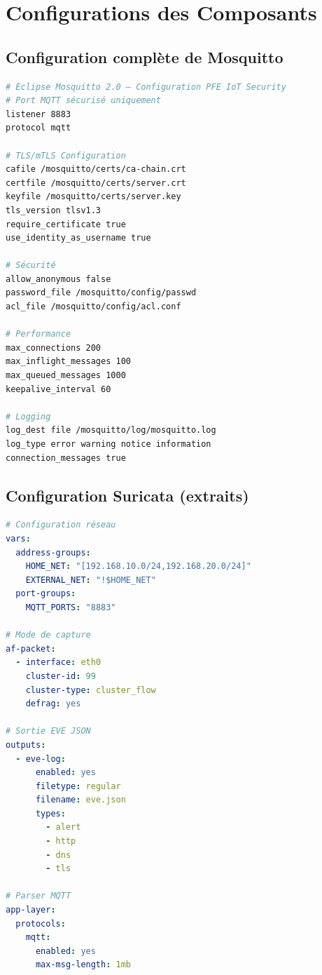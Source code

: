 \chapter{Configurations des Composants}
\label{annex:configs}

\section{Configuration complète de Mosquitto}

\begin{lstlisting}[language=bash, caption=mosquitto.conf — Configuration TLS/mTLS complète]
# Eclipse Mosquitto 2.0 — Configuration PFE IoT Security
# Port MQTT sécurisé uniquement
listener 8883
protocol mqtt

# TLS/mTLS Configuration
cafile /mosquitto/certs/ca-chain.crt
certfile /mosquitto/certs/server.crt
keyfile /mosquitto/certs/server.key
tls_version tlsv1.3
require_certificate true
use_identity_as_username true

# Sécurité
allow_anonymous false
password_file /mosquitto/config/passwd
acl_file /mosquitto/config/acl.conf

# Performance
max_connections 200
max_inflight_messages 100
max_queued_messages 1000
keepalive_interval 60

# Logging
log_dest file /mosquitto/log/mosquitto.log
log_type error warning notice information
connection_messages true
\end{lstlisting}

\section{Configuration Suricata (extraits)}

\begin{lstlisting}[language=yaml, caption=suricata.yaml — Sections clés]
# Configuration réseau
vars:
  address-groups:
    HOME_NET: "[192.168.10.0/24,192.168.20.0/24]"
    EXTERNAL_NET: "!$HOME_NET"
  port-groups:
    MQTT_PORTS: "8883"

# Mode de capture
af-packet:
  - interface: eth0
    cluster-id: 99
    cluster-type: cluster_flow
    defrag: yes

# Sortie EVE JSON
outputs:
  - eve-log:
      enabled: yes
      filetype: regular
      filename: eve.json
      types:
        - alert
        - http
        - dns
        - tls

# Parser MQTT
app-layer:
  protocols:
    mqtt:
      enabled: yes
      max-msg-length: 1mb
\end{lstlisting}

